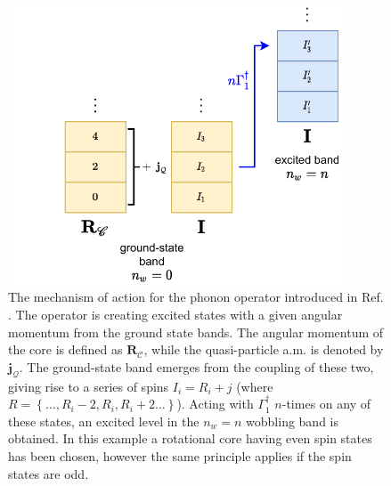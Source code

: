 \begin{figure}
    \centering
    \includegraphics[width=0.9\textwidth]{Chapters/Figures/w0_phonon_operator.pdf}
    \caption{The mechanism of action for the phonon operator introduced in Ref. \cite{raduta2017semiclassical}. The operator is creating excited states with a given angular momentum from the ground state bands. The angular momentum of the core is defined as $\mathbf{R}_\mathscr{C}$, while the quasi-particle a.m. is denoted by $\mathbf{j}_\mathcal{Q}$. The ground-state band emerges from the coupling of these two, giving rise to a series of spins $I_i=R_i+j$ (where $R=\left\{\dots,R_i-2,R_i,R_i+2\dots\right\}$). Acting with $\Gamma_1^\dagger$ $n$-times on any of these states, an excited level in the $n_w=n$ wobbling band is obtained. In this example a rotational core having even spin states has been chosen, however the same principle applies if the spin states are odd.}
    \label{phonon-operator-schematic}
\end{figure}

